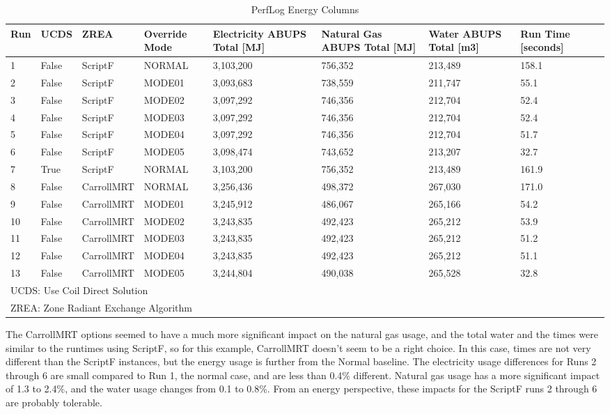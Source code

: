 {\scriptsize
\begin{longtable}[c]{p{0.3in}p{0.4in}p{0.6in}p{0.75in}p{0.5in}p{0.5in}p{0.75in}p{0.75in}p{0.75in}}
\caption{PerfLog Energy Columns\label{table:perflog_mode_columns}} \tabularnewline
\toprule
Run &
  UCDS &
  ZREA &
  Override Mode &
  Electricity ABUPS Total {[}MJ{]} &
  Natural Gas ABUPS Total {[}MJ{]} &
  Water ABUPS Total {[}m3{]} &
  Run Time {[}seconds{]} \tabularnewline
\midrule
\endfirsthead

1  & False & ScriptF  & NORMAL & 3,103,200 & 756,352 & 213,489 & 158.1 \tabularnewline
2  & False & ScriptF  & MODE01 & 3,093,683 & 738,559 & 211,747 & 55.1  \tabularnewline
3  & False & ScriptF  & MODE02 & 3,097,292 & 746,356 & 212,704 & 52.4  \tabularnewline
4  & False & ScriptF  & MODE03 & 3,097,292 & 746,356 & 212,704 & 52.4  \tabularnewline
5  & False & ScriptF  & MODE04 & 3,097,292 & 746,356 & 212,704 & 51.7  \tabularnewline
6  & False & ScriptF  & MODE05 & 3,098,474 & 743,652 & 213,207 & 32.7  \tabularnewline
7  & True  & ScriptF  & NORMAL & 3,103,200 & 756,352 & 213,489 & 161.9 \tabularnewline
8  & False & CarrollMRT & NORMAL & 3,256,436 & 498,372 & 267,030 & 171.0 \tabularnewline
9  & False & CarrollMRT & MODE01 & 3,245,912 & 486,067 & 265,166 & 54.2  \tabularnewline
10 & False & CarrollMRT & MODE02 & 3,243,835 & 492,423 & 265,212 & 53.9  \tabularnewline
11 & False & CarrollMRT & MODE03 & 3,243,835 & 492,423 & 265,212 & 51.2  \tabularnewline
12 & False & CarrollMRT & MODE04 & 3,243,835 & 492,423 & 265,212 & 51.1  \tabularnewline
13 & False & CarrollMRT & MODE05 & 3,244,804 & 490,038 & 265,528 & 32.8  \tabularnewline
\multicolumn{8}{l}{UCDS: Use Coil Direct Solution} \tabularnewline
\multicolumn{8}{l}{ZREA: Zone Radiant Exchange Algorithm} \tabularnewline
\bottomrule
\end{longtable}
}

The CarrollMRT options seemed to have a much more significant impact on the natural gas usage, and the total water and the times were similar to the runtimes using ScriptF, so for this example, CarrollMRT doesn’t seem to be a right choice. In this case, times are not very different than the ScriptF instances, but the energy usage is further from the Normal baseline. The electricity usage differences for Runs 2 through 6 are small compared to Run 1, the normal case, and are less than 0.4\% different. Natural gas usage has a more significant impact of 1.3 to 2.4\%, and the water usage changes from 0.1 to 0.8\%. From an energy perspective, these impacts for the ScriptF runs 2 through 6 are probably tolerable. 


